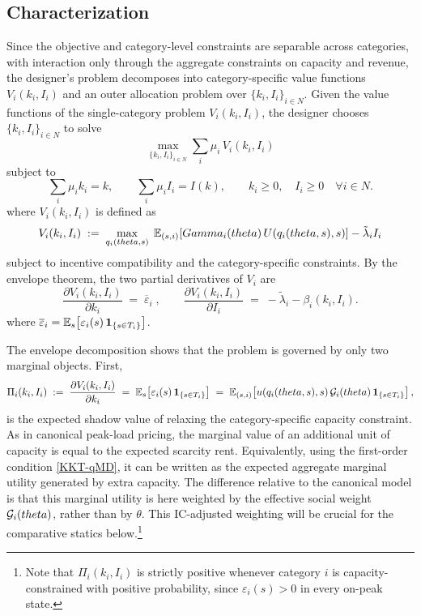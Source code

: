 \documentclass{class}
\begin{document}
\subsection{Characterization}

Since the objective and category-level constraints are separable across categories, with interaction only through the aggregate constraints on capacity and revenue, the designer's problem decomposes into category-specific value functions \(V_i(k_i,I_i)\) and an outer allocation problem over \(\{k_i,I_i\}_{i\in N}\). Given the value functions of the single-category problem \(V_i(k_i,I_i)\), the designer chooses \(\{k_i,I_i\}_{i\in N}\) to solve
\[
\max_{\{k_i,I_i\}_{i\in N}} \sum_i\mu_i\,V_i(k_i,I_i)
\]
subject to
\[
\sum_i\mu_i k_i = k,
\qquad
\sum_i\mu_i I_i = I(k),
\qquad
k_i\ge 0,\quad I_i\ge 0 \quad \forall i\in N.
\]
where $V_i(k_i, I_i)$ is defined as
\[
V_i(k_i, I_i) \;:=\; \max_{q_i(theta,s)} \;\mathbb{E}_{(s,i)}\!\left[Gamma_i(theta)\,U\!\left(q_i(theta,s),s\right)\right] - \tilde\lambda_i I_i
\]
subject to incentive compatibility and the category-specific constraints. By the envelope theorem, the two partial derivatives of $V_i$ are
\[
\frac{\partial  V_i(k_i,I_i)}{\partial k_i} \;=\; \overline \varepsilon_i \; , \qquad \frac{\partial  V_i(k_i,I_i)}{\partial I_i} \;=\; -\tilde\lambda_i - \beta_i(k_i,I_i).
\]
where $\overline \varepsilon_i =\mathbb{E}_s\!\left[\varepsilon_i(s)\,\mathbf{1}_{\{s\in T_i\}}\right]$.

The envelope decomposition shows that the problem is governed by only two marginal objects. First,
\[
\Pi_i(k_i,I_i) \;:=\; \frac{\partial  V_i(k_i,I_i)}{\partial k_i} \;=\; \mathbb{E}_s\!\left[\varepsilon_i(s)\,\mathbf{1}_{\{s\in T_i\}}\right] \;=\; \mathbb{E}_{(s,i)}\!\left[ u(q_i(theta,s),s)\,\mathcal{G}_i(theta)\,\mathbf{1}_{\{s\in T_i\}}\right], \]
is the expected shadow value of relaxing the category-specific capacity constraint. As in canonical peak-load pricing, the marginal value of an additional unit of capacity is equal to the expected scarcity rent. Equivalently, using the first-order condition \ref{KKT-qMD}, it can be written as the expected aggregate marginal utility generated by extra capacity. The difference relative to the canonical model is that this marginal utility is here weighted by the effective social weight \(\mathcal{G}_i(theta)\), rather than by $\theta$. This IC-adjusted weighting will be crucial for the comparative statics below.\footnote{Note that \(\Pi_i(k_i,I_i)\) is strictly positive whenever category \(i\) is capacity-constrained with positive probability, since \(\varepsilon_i(s)>0\) in every on-peak state.}
\end{document}
